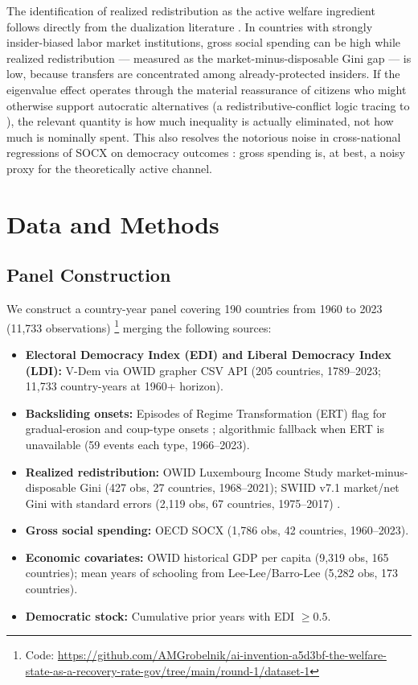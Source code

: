 \documentclass[11pt,letterpaper]{article}
\begin{document}
The identification of realized redistribution as the active welfare ingredient follows directly from the dualization
literature \citep{Lindvall2014,Emmenegger2012}. In countries with strongly insider-biased labor market institutions,
gross social spending can be high while realized redistribution --- measured as the market-minus-disposable Gini gap ---
is low, because transfers are concentrated among already-protected insiders. If the eigenvalue effect operates through
the material reassurance of citizens who might otherwise support autocratic alternatives (a redistributive-conflict logic
tracing to \citet{Acemoglu2006,Acemoglu2000}), the relevant quantity is how much inequality is actually eliminated, not
how much is nominally spent. This also resolves the notorious noise in cross-national regressions of SOCX on democracy
outcomes \citep{Kumlin2014}: gross spending is, at best, a noisy proxy for the theoretically active channel.

\section{Data and Methods}
\label{sec:methods}

\subsection{Panel Construction}

We construct a country-year panel covering 190 countries from 1960 to 2023 (11,733 observations)%
\footnote{Code: \url{https://github.com/AMGrobelnik/ai-invention-a5d3bf-the-welfare-state-as-a-recovery-rate-gov/tree/main/round-1/dataset-1}}
merging the following sources:

\begin{itemize}
  \item \textbf{Electoral Democracy Index (EDI) and Liberal Democracy Index (LDI):} V-Dem via OWID grapher CSV API
    (205 countries, 1789--2023; 11,733 country-years at 1960+ horizon).
  \item \textbf{Backsliding onsets:} Episodes of Regime Transformation (ERT) flag for gradual-erosion and coup-type
    onsets \citep{Maerz2024}; algorithmic fallback when ERT is unavailable (59 events each type, 1966--2023).
  \item \textbf{Realized redistribution:} OWID Luxembourg Income Study market-minus-disposable Gini (427 obs, 27
    countries, 1968--2021); SWIID v7.1 market/net Gini with standard errors (2,119 obs, 67 countries, 1975--2017)
    \citep{Solt2019}.
  \item \textbf{Gross social spending:} OECD SOCX (1,786 obs, 42 countries, 1960--2023).
  \item \textbf{Economic covariates:} OWID historical GDP per capita (9,319 obs, 165 countries); mean years of
    schooling from Lee-Lee/Barro-Lee (5,282 obs, 173 countries).
  \item \textbf{Democratic stock:} Cumulative prior years with EDI $\geq 0.5$.
\end{itemize}
\end{document}
